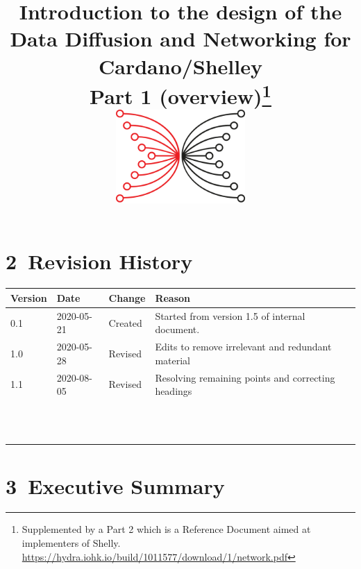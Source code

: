 \documentclass[11pt,a4paper]{article}
\begin{document}
\title{Introduction to the design of the
       Data Diffusion and Networking for
       Cardano/Shelley \\
       Part 1 (overview)\footnote{Supplemented by a Part 2 which is a
       Reference Document aimed at implementers of Shelly.
  \href{https://hydra.iohk.io/build/1011577/download/1/network.pdf}{{https://hydra.iohk.io/build/1011577/download/1/network.pdf}}} \\ \vspace{1cm}
       \includegraphics[width=1.95833in,height=1.40669in]{./media/image3.png}
  }
\date{}

\maketitle

\tableofcontents

\hypertarget{revision-history}{%
\section{​2​~Revision History}\label{revision-history}}

\begin{longtable}[]{@{}llll@{}}
\toprule
\textbf{Version} & \textbf{Date} & \textbf{Change} &
\textbf{Reason}\tabularnewline
\midrule
\endhead
0.1 & 2020-05-21 & Created & Started from version 1.5 of internal
document.\tabularnewline
1.0 & 2020-05-28 & Revised & Edits to remove irrelevant and redundant
material\tabularnewline
1.1 & 2020-08-05 & Revised & Resolving remaining points and correcting
headings\tabularnewline
& & &\tabularnewline
& & &\tabularnewline
& & &\tabularnewline
& & &\tabularnewline
& & &\tabularnewline
& & &\tabularnewline
& & &\tabularnewline
& & &\tabularnewline
& & &\tabularnewline
& & &\tabularnewline
& & &\tabularnewline
& & &\tabularnewline
\bottomrule
\end{longtable}

\hypertarget{executive-summary}{%
\section{​3​~Executive Summary}\label{executive-summary}}
\end{document}
